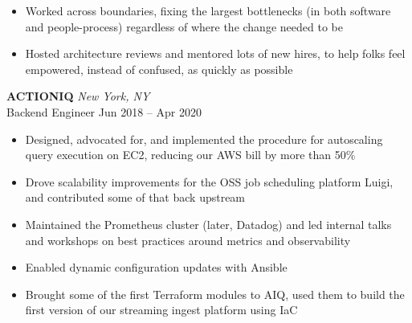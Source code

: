 \documentclass[letterpaper]{article}
\begin{document}
\begin{bgbox}[height=\paperheight, colback=white, width=0.62\textwidth]
\begin{itemize} [noitemsep,topsep=4pt]
			\item Worked across boundaries, fixing the largest bottlenecks (in both software and people-process) regardless of where the change needed to be
			\item Hosted architecture reviews and mentored lots of new hires, to help folks feel empowered, instead of confused, as quickly as possible
		\end{itemize}
		\vspace*{12pt}
		\textbf{ACTIONIQ} \hfill \textit{New York, NY}\\
		Backend Engineer \hfill Jun 2018 -- Apr 2020
		\begin{itemize} [noitemsep,topsep=4pt]
			\item Designed, advocated for, and implemented the procedure for autoscaling query execution on EC2, reducing our AWS bill by more than 50\%
			\item Drove scalability improvements for the OSS job scheduling platform Luigi, and contributed some of that back upstream
			\item Maintained the Prometheus cluster (later, Datadog) and led internal talks and workshops on best practices around metrics and observability
			\item Enabled dynamic configuration updates with Ansible
			\item Brought some of the first Terraform modules to AIQ, used them to build \linebreak the first version of our streaming ingest platform using IaC
		\end{itemize}

\end{bgbox}
\end{document}
